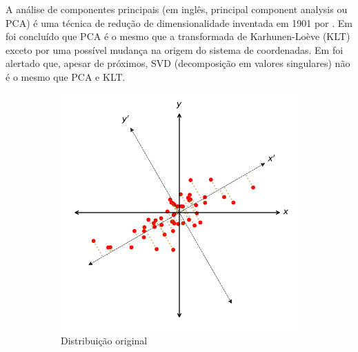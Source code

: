 A análise de componentes principais (em inglês, principal component analysis ou PCA) é uma técnica de redução de dimensionalidade inventada em 1901 por .
Em \cite{gerbrands1981relationships} foi concluído que PCA é o mesmo que a transformada de Karhunen-Loève (KLT) exceto por uma possível mudança na origem do sistema de coordenadas.
Em \cite{andrews1975two} foi alertado que, apesar de próximos, SVD (decomposição em valores singulares) não é o mesmo que PCA e KLT. 

\begin{figure}[htbp]
    \caption{Análise de Componentes Principais}
    \label{fig:pca}
    \begin{subfigure}[c]{0.45\textwidth}
    \centering
    \includegraphics[width=\textwidth]{imagens/pca1.pdf}
    \caption{Distribuição original}
    \end{subfigure}
    \begin{subfigure}[c]{0.45\textwidth}
    \centering

\end{subfigure}
\end{figure}

